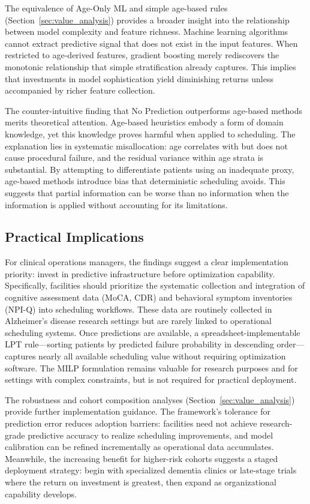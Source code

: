 \documentclass[msom,blindrev]{informs3}
\begin{document}
The equivalence of Age-Only ML and simple age-based rules (Section~\ref{sec:value_analysis}) provides a broader insight into the relationship between model complexity and feature richness. Machine learning algorithms cannot extract predictive signal that does not exist in the input features. When restricted to age-derived features, gradient boosting merely rediscovers the monotonic relationship that simple stratification already captures. This implies that investments in model sophistication yield diminishing returns unless accompanied by richer feature collection.

The counter-intuitive finding that No Prediction outperforms age-based methods merits theoretical attention. Age-based heuristics embody a form of domain knowledge, yet this knowledge proves harmful when applied to scheduling. The explanation lies in systematic misallocation: age correlates with but does not cause procedural failure, and the residual variance within age strata is substantial. By attempting to differentiate patients using an inadequate proxy, age-based methods introduce bias that deterministic scheduling avoids. This suggests that partial information can be worse than no information when the information is applied without accounting for its limitations.

\subsection{Practical Implications}

For clinical operations managers, the findings suggest a clear implementation priority: invest in predictive infrastructure before optimization capability. Specifically, facilities should prioritize the systematic collection and integration of cognitive assessment data (MoCA, CDR) and behavioral symptom inventories (NPI-Q) into scheduling workflows. These data are routinely collected in Alzheimer's disease research settings but are rarely linked to operational scheduling systems. Once predictions are available, a spreadsheet-implementable LPT rule---sorting patients by predicted failure probability in descending order---captures nearly all available scheduling value without requiring optimization software. The MILP formulation remains valuable for research purposes and for settings with complex constraints, but is not required for practical deployment.

The robustness and cohort composition analyses (Section~\ref{sec:value_analysis}) provide further implementation guidance. The framework's tolerance for prediction error reduces adoption barriers: facilities need not achieve research-grade predictive accuracy to realize scheduling improvements, and model calibration can be refined incrementally as operational data accumulates. Meanwhile, the increasing benefit for higher-risk cohorts suggests a staged deployment strategy: begin with specialized dementia clinics or late-stage trials where the return on investment is greatest, then expand as organizational capability develops.
\end{document}
